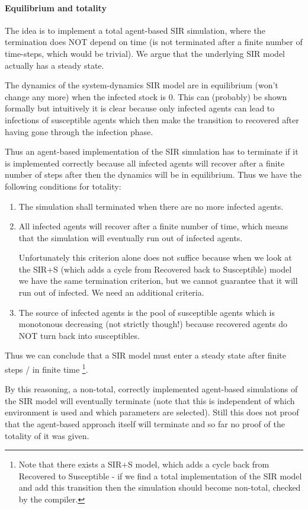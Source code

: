 \paragraph{Equilibrium and totality}
The idea is to implement a total agent-based SIR simulation, where the termination does NOT depend on time (is not terminated after a finite number of time-steps, which would be trivial).  We argue that the underlying SIR model actually has a steady state.

The dynamics of the system-dynamics SIR model are in equilibrium (won't change any more) when the infected stock is 0. This can (probably) be shown formally but intuitively it is clear because only infected agents can lead to infections of susceptible agents which then make the transition to recovered after having gone through the infection phase. 

Thus an agent-based implementation of the SIR simulation has to terminate if it is implemented correctly because all infected agents will recover after a finite number of steps after then the dynamics will be in equilibrium. Thus we have the following conditions for totality:
\begin{enumerate}
	\item The simulation shall terminated when there are no more infected agents.
	\item All infected agents will recover after a finite number of time, which means that the simulation will eventually run out of infected agents. 
	
	Unfortunately this criterion alone does not suffice because when we look at the SIR+S (which adds a cycle from Recovered back to Susceptible) model we have the same termination criterion, but we cannot guarantee that it will run out of infected. We need an additional criteria.
	\item The source of infected agents is the pool of susceptible agents which is monotonous decreasing (not strictly though!) because recovered agents do NOT turn back into susceptibles.
\end{enumerate}

Thus we can conclude that a SIR model must enter a steady state after finite steps / in finite time \footnote{Note that there exists a SIR+S model, which adds a cycle back from Recovered to Susceptible - if we find a total implementation of the SIR model and add this transition then the simulation should become non-total, checked by the compiler.}.

By this reasoning, a non-total, correctly implemented agent-based simulations of the SIR model will eventually terminate (note that this is independent of which environment is used and which parameters are selected). Still this does not proof that the agent-based approach itself will terminate and so far no proof of the totality of it was given.

